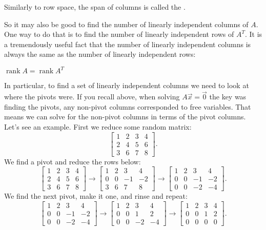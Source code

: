\medskip

Similarly to row space, the span of columns is called the
\emph{}.

So it may also be good to find the number of linearly independent columns
of $A$.  One way to do that is to find the number of linearly independent
rows of $A^T$.  It is a tremendously useful fact that the number of
linearly independent
columns is always the same as the number of linearly independent rows:

\begin{theorem}
$\operatorname{rank} A = \operatorname{rank} A^T$
\end{theorem}

In particular, to find a set of linearly independent columns we need to
look at where the pivots were.  If you recall above, when solving $A \vec{x}
= \vec{0}$ the key was finding the pivots, any non-pivot columns corresponded to
free variables.  That means we can solve for the non-pivot columns in terms
of the pivot columns.  Let's see an example.  First we reduce some
random matrix:
\begin{equation*}
\begin{bmatrix}
1 & 2 & 3 & 4 \\
2 & 4 & 5 & 6 \\
3 & 6 & 7 & 8
\end{bmatrix} .
\end{equation*}
We find a pivot and reduce the rows below:
\begin{equation*}
\begin{bmatrix}
\boxed{1} & 2 & 3 & 4 \\
2 & 4 & 5 & 6 \\
3 & 6 & 7 & 8
\end{bmatrix} 
\to
\begin{bmatrix}
\boxed{1} & 2 & 3 & 4 \\
0 & 0 & -1 & -2 \\
3 & 6 & 7 & 8
\end{bmatrix} 
\to
\begin{bmatrix}
\boxed{1} & 2 & 3 & 4 \\
0 & 0 & -1 & -2 \\
0 & 0 & -2 & -4
\end{bmatrix} .
\end{equation*}
We find the next pivot, make it one, and rinse and repeat:
\begin{equation*}
\begin{bmatrix}
\boxed{1} & 2 & 3 & 4 \\
0 & 0 & \boxed{-1} & -2 \\
0 & 0 & -2 & -4
\end{bmatrix} 
\to
\begin{bmatrix}
\boxed{1} & 2 & 3 & 4 \\
0 & 0 & \boxed{1} & 2 \\
0 & 0 & -2 & -4
\end{bmatrix} 
\to
\begin{bmatrix}
\boxed{1} & 2 & 3 & 4 \\
0 & 0 & \boxed{1} & 2 \\
0 & 0 & 0 & 0
\end{bmatrix} . 
\end{equation*}
